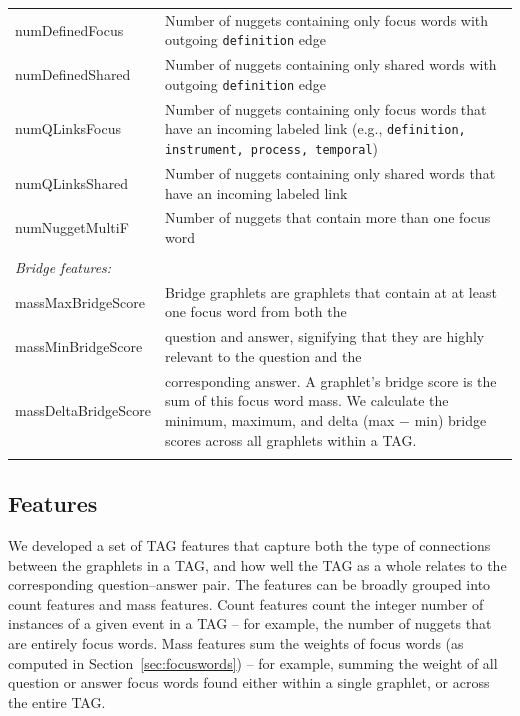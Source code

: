 \begin{table}[]
{\begin{tabular}{p{30mm}p{95mm}}
numDefinedFocus		&	Number of nuggets containing only focus words with outgoing {\tt definition} edge \\
numDefinedShared	&	Number of nuggets containing only shared words with outgoing {\tt definition} edge \\
numQLinksFocus		&	Number of nuggets containing only focus words that have an incoming labeled link (e.g., {\tt definition, instrument, process, temporal})  \\
numQLinksShared		&	Number of nuggets containing only shared words that have an incoming labeled link  \\
numNuggetMultiF		&	Number of nuggets that contain more than one focus word\\
\\
\multicolumn{2}{l}{\emph{Bridge features:}} \\
massMaxBridgeScore		&	Bridge graphlets are graphlets that contain at at least one focus word from both the  \\
massMinBridgeScore		&	question and answer, signifying that they are highly relevant to the question and the \\
massDeltaBridgeScore	&	corresponding answer. A   graphlet's bridge score is the sum of this focus word mass.  We calculate the minimum, maximum, and delta (max $-$ min) bridge scores across all graphlets within a TAG. \\
\\



\hline
\end{tabular}
}
\label{tab:features}
\end{table}


\subsection {Features} 
\label{sec:featuresandscoring}

We developed a set of TAG features that capture both the type of connections between the graphlets in a TAG, and how well the TAG as a whole relates to the corresponding question--answer pair.
The features can be broadly grouped into count features and mass features. Count features count the integer number of instances of a given event in a TAG -- for example, the number of nuggets that are entirely focus words.  Mass features sum the weights of focus words (as computed in Section~\ref{sec:focuswords}) -- for example, summing the weight of all question or answer focus words found either within a single graphlet, or across the entire TAG.

